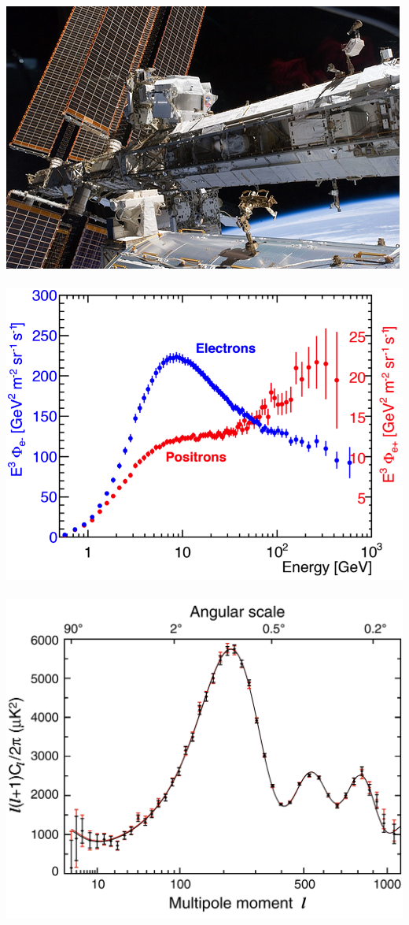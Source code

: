 \documentclass{beamer}
\begin{document}
\begin{frame}
\begin{minipage}[b]{0.8\paperwidth}
\mbox{
\includegraphics[height=0.20\textwidth,width=0.15\paperwidth]{THESISPLOTS/New-Physics-PLOTS/AMS-ON-ISS.jpg} \quad
\includegraphics[height=0.20\textwidth,width=0.20\paperwidth]{THESISPLOTS/New-Physics-PLOTS/AMS-Electron-Positron-Flux-Difference.png} \quad
\includegraphics[height=0.20\textwidth,width=0.25\paperwidth]{THESISPLOTS/New-Physics-PLOTS/CMB_Multiple_Moments.png}
}

\end{minipage}


\end{frame}
\end{document}
